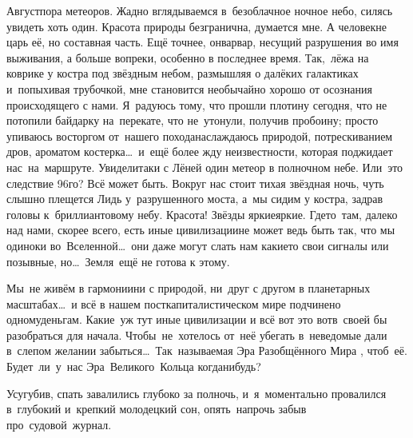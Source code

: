 Август\mdash пора метеоров. Жадно вглядываемся в~безоблачное ночное небо, силясь увидеть хоть один. Красота природы безгранична, думается мне. А человек\mdash не царь её, но составная часть. Ещё точнее, он\mdash варвар, несущий разрушения во имя выживания, а больше вопреки, особенно в последнее время. Так,~лёжа на коврике у костра под звёздным небом, размышляя о далёких галактиках и~попыхивая трубочкой, мне становится необычайно хорошо от осознания происходящего с нами. Я~радуюсь тому, что прошли плотину сегодня, что не потопили байдарку на~перекате, что не~утонули, получив пробоину; просто упиваюсь восторгом от~нашего похода\mdash наслаждаюсь природой, потрескиванием дров, ароматом костерка\ldots~и~ещё более жду неизвестности, которая поджидает нас~на~маршруте.
\newpage
Увидели\sdash таки с Лёней один метеор в полночном небе. Или~это следствие 96\sdash го? Всё может быть. Вокруг нас стоит тихая звёздная ночь, чуть слышно плещется Лидь у~разрушенного моста, а~мы сидим у костра, задрав головы к~бриллиантовому небу. Красота! Звёзды яркие\sdash яркие. Где\sdash то~там, далеко над нами, скорее всего, есть иные цивилизации\mdash не может ведь быть так, что мы одиноки во~Вселенной\ldots~они даже могут слать нам какие\sdash то свои сигналы или позывные, но\ldots~Земля~ещё не готова к этому. 

Мы~не живём в гармонии\mdash ни с природой, ни~друг с другом в планетарных масштабах\ldots~и всё в нашем посткапиталистическом мире подчинено одному\mdash деньгам. Какие~уж тут иные цивилизации и всё вот это вот\mdash в~своей бы разобраться для начала. Чтобы~не~хотелось от~неё убегать в~неведомые дали в~слепом желании забыться\ldots~Так~называемая Эра Разобщённого Мира \cite{ТуманностьАндромеды}, чтоб~её. Будет~ли~у~нас Эра~Великого~Кольца когда\sdash нибудь?

Усугубив, спать завалились глубоко за полночь, и~я~моментально провалился в~глубокий и~крепкий молодецкий сон, опять~напрочь забыв про~судовой~журнал.

\begin{center}
\end{center}
